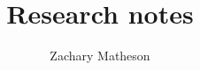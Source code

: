 \documentclass[a4paper,12pt]{book}
\begin{document}
	
	\author{Zachary Matheson}
	\title{Research notes}
	
	\frontmatter
	\maketitle
	\tableofcontents
	
	\mainmatter
	
	
	\backmatter
	
	
	
\end{document}
